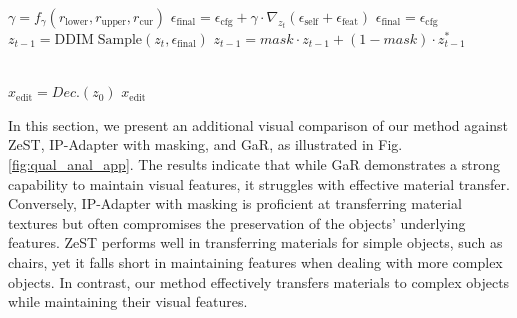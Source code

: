\begin{algorithm}[ht!]
\begin{algorithmic}[1]
            \State $\gamma = f_{\gamma}(r_{\mathrm{lower}}, r_{\mathrm{upper}}, r_{\mathrm{cur}})$
                \State $\epsilon_{\mathrm{final}} = \epsilon_{\mathrm{cfg}} + \gamma \cdot \nabla_{z_t} (\epsilon_{\mathrm{self}} +\epsilon_{\mathrm{feat}})$
            \Else
                \State $\epsilon_{\mathrm{final}} = \epsilon_{\mathrm{cfg}}$
            \EndIf
            \State$z_{t-1} = \mathrm{DDIM\;Sample}(z_t, \epsilon_{\mathrm{final}})$
                \State$z_{t-1} = mask\cdot z_{t-1} + (1 -mask)\cdot z^*_{t-1}$
            \EndIf

        \EndFor
        \\$x_{\mathrm{edit}} = Dec.(z_0)$
        \Return $x_{\mathrm{edit}}$
        
    \end{algorithmic}
    \label{code:method}   
\end{algorithm}

In this section, we present an additional visual comparison of our method against ZeST, IP-Adapter with masking, and GaR, as illustrated in Fig.\ref{fig:qual_anal_app}. The results indicate that while GaR demonstrates a strong capability to maintain visual features, it struggles with effective material transfer. Conversely, IP-Adapter with masking is proficient at transferring material textures but often compromises the preservation of the objects' underlying features. ZeST performs well in transferring materials for simple objects, such as chairs, yet it falls short in maintaining features when dealing with more complex objects.
In contrast, our method effectively transfers materials to complex objects while maintaining their visual features.



